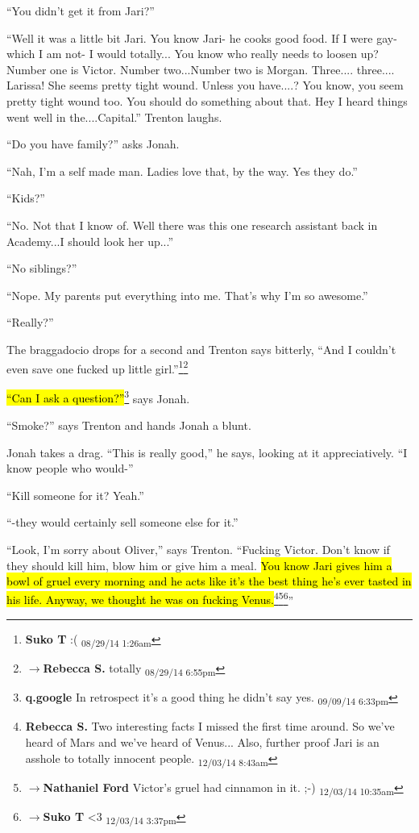 ``You didn't get it from Jari?''

``Well it was a little bit Jari.  You know Jari- he cooks good food.  If I were gay- which I am not- I would totally... You know who really needs to loosen up?  Number one is Victor.  Number two...Number two is Morgan.  Three.... three.... Larissa!  She seems pretty tight wound.  Unless you have....?  You know, you seem pretty tight wound too.  You should do something about that.  Hey I heard things went well in the....Capital.''  Trenton laughs.

``Do you have family?'' asks Jonah.

``Nah, I'm a self made man.  Ladies love that, by the way.  Yes they do.''

``Kids?''

``No.  Not that I know of.  Well there was this one research assistant back in Academy...I should look her up...''

``No siblings?''  

``Nope.  My parents put everything into me. That's why I'm so awesome.''

``Really?''

The braggadocio drops for a second and Trenton says bitterly, ``And I couldn't even save one fucked up little girl.''\footnote{\textbf{Suko T }:( \textsubscript{08/29/14 1:26am}}\footnote{$\rightarrow$\textbf{Rebecca S. }totally \textsubscript{08/29/14 6:55pm}}

\hl{``Can I ask a question?''}\footnote{\textbf{q.google }In retrospect it's a good thing he didn't say yes. \textsubscript{09/09/14 6:33pm}} says Jonah.

``Smoke?'' says Trenton and hands Jonah a blunt.

Jonah takes a drag.  ``This is really good,'' he says, looking at it appreciatively.  ``I know people who would-''

``Kill someone for it?  Yeah.''

``-they would certainly sell someone else for it.''

``Look, I'm sorry about Oliver,'' says Trenton.  ``Fucking Victor.  Don't know if they should kill him, blow him or give him a meal.   \hl{You know Jari gives him a bowl of gruel every morning and he acts like it's the best thing he's ever tasted in his life.  Anyway, we thought he was on fucking Venus.}\footnote{\textbf{Rebecca S. }Two interesting facts I missed the first time around.  So we've heard of Mars and we've heard of Venus...
Also, further proof Jari is an asshole to totally innocent people. \textsubscript{12/03/14 8:43am}}\footnote{$\rightarrow$\textbf{Nathaniel Ford }Victor's gruel had cinnamon in it. ;-) \textsubscript{12/03/14 10:35am}}\footnote{$\rightarrow$\textbf{Suko T }\textless 3 \textsubscript{12/03/14 3:37pm}}''

